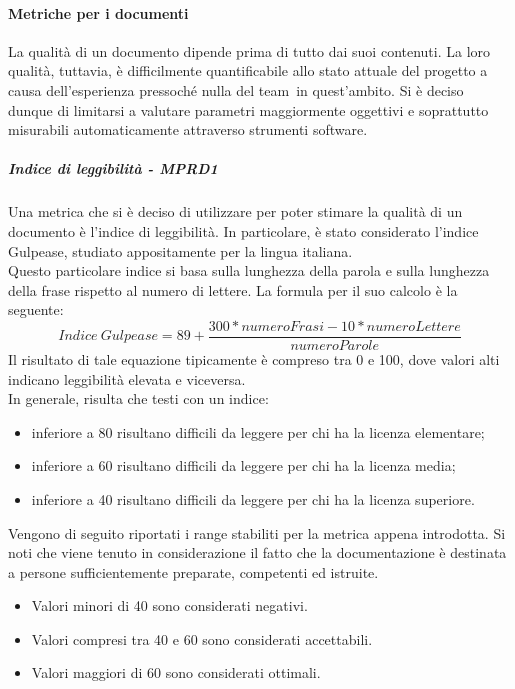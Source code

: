 \documentclass[../PianoDiQualifica.tex]{subfiles}
\begin{document}
			\paragraph{Metriche per i documenti}
			La qualità di un documento dipende prima di tutto dai suoi contenuti. La loro qualità, tuttavia, è difficilmente quantificabile allo stato attuale del progetto a causa dell'esperienza pressoché nulla del team\g\ in quest'ambito. Si è deciso dunque di limitarsi a valutare parametri maggiormente oggettivi e soprattutto misurabili automaticamente attraverso strumenti software\g.
				\subparagraph{Indice di leggibilità - MPRD1}
				Una metrica che si è deciso di utilizzare per poter stimare la qualità di un documento è l'indice di leggibilità. In particolare, è stato considerato l'indice Gulpease\g, studiato appositamente per la lingua italiana.				\\Questo particolare indice si basa sulla lunghezza della parola e sulla lunghezza della frase rispetto al numero di lettere. La formula per il suo calcolo è la seguente:
				\begin{equation}
					Indice \  Gulpease = 89 + \frac{300*numeroFrasi-10*numeroLettere}{numeroParole}
				\end{equation}
				Il risultato di tale equazione tipicamente è compreso tra 0 e 100, dove valori alti indicano leggibilità elevata e viceversa.\\
				In generale, risulta che testi con un indice:
				\begin{itemize}
					\item inferiore a 80 risultano difficili da leggere per chi ha la licenza elementare;
					\item inferiore a 60 risultano difficili da leggere per chi ha la licenza media;
					\item inferiore a 40 risultano difficili da leggere per chi ha la licenza superiore.
				\end{itemize}
				Vengono di seguito riportati i range stabiliti per la metrica appena introdotta. Si noti che viene tenuto in considerazione il fatto che la documentazione è destinata a persone sufficientemente preparate, competenti ed istruite.
				\begin{itemize}
					\item Valori minori di 40 sono considerati negativi.
					\item Valori compresi tra 40 e 60 sono considerati accettabili.
					\item Valori maggiori di 60 sono considerati ottimali. 
				\end{itemize}
\end{document}
